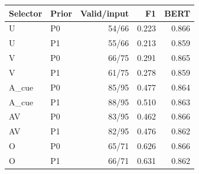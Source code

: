 \begin{tabular}{llrrr}
\toprule Selector & Prior & Valid/input & F1 & BERT \\
\midrule
U & P0 & 54/66 & 0.223 & 0.866 \\
U & P1 & 55/66 & 0.213 & 0.859 \\
V & P0 & 66/75 & 0.291 & 0.865 \\
V & P1 & 61/75 & 0.278 & 0.859 \\
A\_cue & P0 & 85/95 & 0.477 & 0.864 \\
A\_cue & P1 & 88/95 & 0.510 & 0.863 \\
AV & P0 & 83/95 & 0.462 & 0.866 \\
AV & P1 & 82/95 & 0.476 & 0.862 \\
O & P0 & 65/71 & 0.626 & 0.866 \\
O & P1 & 66/71 & 0.631 & 0.862 \\
\bottomrule
\end{tabular}
